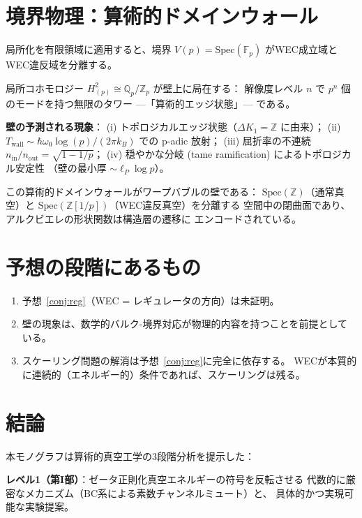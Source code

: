 \documentclass[11pt,a4paper]{article}
\newcommand{\Spec}{\mathrm{Spec}}
\newcommand{\Zp}{\mathbb{Z}[1/p]}
\newcommand{\Qp}{\mathbb{Q}_p}
\newcommand{\Fp}{\mathbb{F}_p}
\begin{document}
\section{境界物理：算術的ドメインウォール}

局所化を有限領域に適用すると、境界
$V(p) = \Spec(\Fp)$ がWEC成立域とWEC違反域を分離する。

局所コホモロジー $H^2_{(p)} \cong \Qp/\mathbb{Z}_p$ が壁上に局在する：
解像度レベル $n$ で $p^n$ 個のモードを持つ無限のタワー
---「算術的エッジ状態」---  である。

\textbf{壁の予測される現象}：
(i) トポロジカルエッジ状態（$\Delta K_1 = \mathbb{Z}$ に由来）；
(ii) $T_{\mathrm{wall}} \sim \hbar\omega_0\log(p)/(2\pi k_B)$ での p-adic 放射；
(iii) 屈折率の不連続 $n_{\mathrm{in}}/n_{\mathrm{out}} = \sqrt{1-1/p}$；
(iv) 穏やかな分岐 (tame ramification) によるトポロジカル安定性
（壁の最小厚 $\sim \ell_P\log p$）。

この算術的ドメインウォールがワープバブルの壁である：
$\Spec(\mathbb{Z})$（通常真空）と $\Spec(\Zp)$（WEC違反真空）を分離する
空間中の閉曲面であり、アルクビエレの形状関数は構造層の遷移に
エンコードされている。

\section{予想の段階にあるもの}

\begin{enumerate}
\item 予想~\ref{conj:reg}（WEC = レギュレータの方向）は未証明。
\item 壁の現象は、数学的バルク-境界対応が物理的内容を持つことを前提としている。
\item スケーリング問題の解消は予想~\ref{conj:reg}に完全に依存する。
  WECが本質的に連続的（エネルギー的）条件であれば、スケーリングは残る。
\end{enumerate}

\newpage
\section*{結論}

本モノグラフは算術的真空工学の3段階分析を提示した：

\textbf{レベル1（第I部）}：ゼータ正則化真空エネルギーの符号を反転させる
代数的に厳密なメカニズム（BC系による素数チャンネルミュート）と、
具体的かつ実現可能な実験提案。
\end{document}
